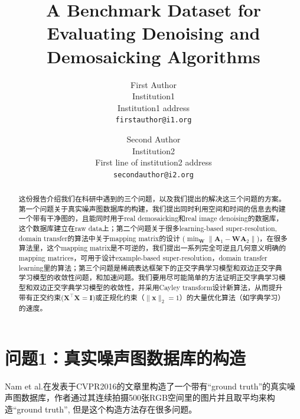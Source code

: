 \documentclass[10pt,twocolumn,letterpaper]{article}
\begin{document}
\title{A Benchmark Dataset for Evaluating Denoising and Demosaicking Algorithms}

\author{First Author\\
Institution1\\
Institution1 address\\
{\tt\small firstauthor@i1.org}
\and
Second Author\\
Institution2\\
First line of institution2 address\\
{\tt\small secondauthor@i2.org}
}

\maketitle


\begin{abstract}
这份报告介绍我们在科研中遇到的三个问题，以及我们提出的解决这三个问题的方案。第一个问题关于真实噪声图数据库的构建，我们提出同时利用空间和时间的信息去构建一个带有干净图的，且能同时用于real demosaicking和real image denoising的数据库，这个数据库建立在raw data上；第二个问题关于很多learning-based super-resolution, domain transfer的算法中关于mapping matrix的设计 ($\min_{\bm{W}}\|\bm{A}_{1}-\bm{W}\bm{A}_{2}\|$)，在很多算法里，这个mapping matrix是不可逆的，我们提出一系列完全可逆且几何意义明确的mapping matrices，可用于设计example-based super-resolution，domain transfer learning里的算法；第三个问题是稀疏表达框架下的正交字典学习模型和双边正交字典学习模型的收敛性问题，和加速问题。我们要用尽可能简单的方法证明正交字典学习模型和双边正交字典学习模型的收敛性，并采用Cayley transform设计新算法，从而提升带有正交约束($\bm{X}^{\top}\bm{X}=\bm{I}$)或正规化约束（$\|\bm{x}\|_{2}=1$）的大量优化算法（如字典学习）的速度。
\end{abstract}

\section{问题1：真实噪声图数据库的构造}

Nam et al.在发表于CVPR2016的文章\cite{crosschannel2016}里构造了一个带有``ground truth''的真实噪声图数据库，作者通过其连续拍摄500张RGB空间里的图片并且取平均来构造``ground truth'', 但是这个构造方法存在很多问题。
\end{document}
